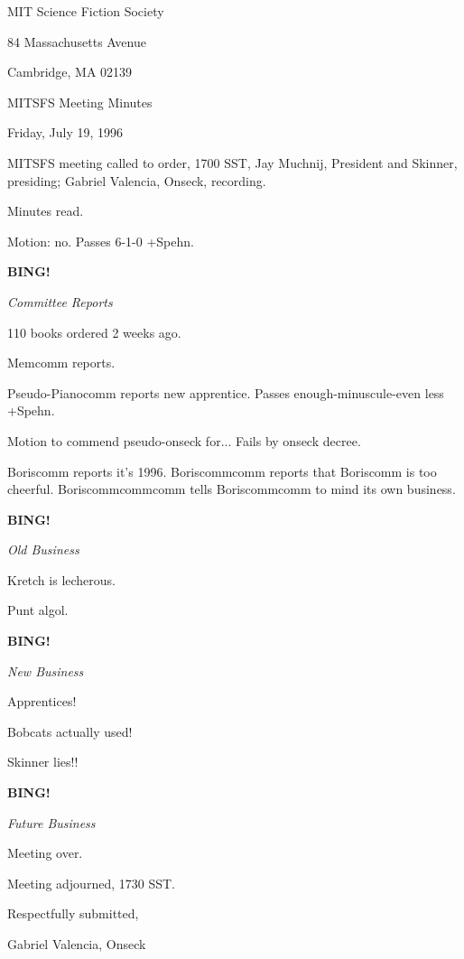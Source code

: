 \documentclass[12pt]{article}
\newcommand{\bing}{{\bf BING!} }
\newcommand{\goto}[1]{\bing \vskip 12pt \centerline{{\em{#1}}}}
\begin{document}
\begin{center}

MIT Science Fiction Society 

84 Massachusetts Avenue

Cambridge, MA 02139

\vspace{12pt}

MITSFS Meeting Minutes 

Friday, July 19, 1996

\end{center}
 
\vspace{18pt}

\setlength{\parskip}{6pt}

\noindent
MITSFS meeting called to order, 1700 SST,
Jay Muchnij, President and Skinner, presiding; Gabriel Valencia, Onseck, recording.

Minutes read.

Motion: no. Passes 6-1-0 +Spehn.

\goto{Committee Reports}

110 books ordered 2 weeks ago.

Memcomm reports.

Pseudo-Pianocomm reports new apprentice. Passes enough-minuscule-even less +Spehn.

Motion to commend pseudo-onseck for... Fails by onseck decree.

Boriscomm reports it's 1996. Boriscommcomm reports that Boriscomm is too cheerful. Boriscommcommcomm tells Boriscommcomm to mind its own business.

\goto{Old Business}

Kretch is lecherous.

Punt algol.

\goto{New Business}

Apprentices!

Bobcats actually used!

Skinner lies!!

\goto{Future Business}

Meeting over.

\vspace{12pt}

\noindent
Meeting adjourned, 1730 SST.

\vspace{18pt}

\centerline{Respectfully submitted,}
\centerline{Gabriel Valencia, Onseck}
\end{document}
